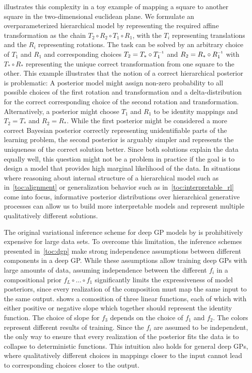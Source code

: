  illustrates this complexity in a toy example of mapping a square to another square in the two-dimensional euclidean plane.
We formulate an overparameterized hierarchical model by representing the required affine transformation as the chain $T_2 \circ R_2 \circ T_1 \circ R_1$, with the $T_i$ representing translations and the $R_i$ representing rotations.
The task can be solved by an arbitrary choice of $T_1$ and $R_1$ and corresponding choices $T_2 = T_\ast \circ T_1\inv$ and $R_2 = R_\ast \circ R_1\inv$ with $T_\ast \circ R_\ast$ representing the unique correct transformation from one square to the other.
This example illustrates that the notion of a correct hierarchical posterior is problematic:
A posterior model might assign non-zero probability to all possible choices of the first rotation and transformation and a delta-distribution for the correct corresponding choice of the second rotation and transformation.
Alternatively, a posterior might choose $T_1$ and $R_1$ to be identity mappings and $T_2 = T_\ast$ and $R_2 = R_\ast$.
While the first posterior might be considered a more correct Bayesian posterior correctly representing unidentifiable parts of the learning problem, the second posterior is arguably simpler and represents the uniqueness of the correct solution better.
Since both solutions explain the data equally well, this question might not be a problem in practice if the goal is to design a model that provides high marginal likelihood of the data.
In situations where reasoning about internal structure of a hierarchical model such as in~\cref{toc:alignment} or generalization behavior such as in~\cref{toc:interpretable_rl} come into focus, informative posterior distributions over hierarchical generative processes can allow us to build more interpretable models and represent multiple qualitatively different solutions.

The original variational inference scheme for deep GP models by \textcite{damianou_deep_2013} is prohibitively expensive for large data sets.
To overcome this limitation, the inference schemes presented in~\cref{toc:dgp} make strong independence assumptions between different components in a deep GP.
While these assumptions allow training deep GPs with large amounts of data, assuming independence between the different $f_i$ in a compositional prior $f_L \circ \dots \circ f_1$ significantly limits the expressiveness of model posteriors, since every realization of the composition must map the same input to the same output.
 shows a comosition of three linear functions, each of which with either positive or negative slope which together should represent the identity function.
The choice of slope for $f_3$ depends on the choice of $f_1$ and $f_2$.
The colors represent different results of training.
Since the $f_i$ are assumed to be independent, the only way to ensure that every realization of the posterior fits the data is to collapse to deterministic functions.
This intuition also holds for general deep GPs, where qualitatively different choices in mappings closer to the input cannot lead to corresponding choices closer to the output.

